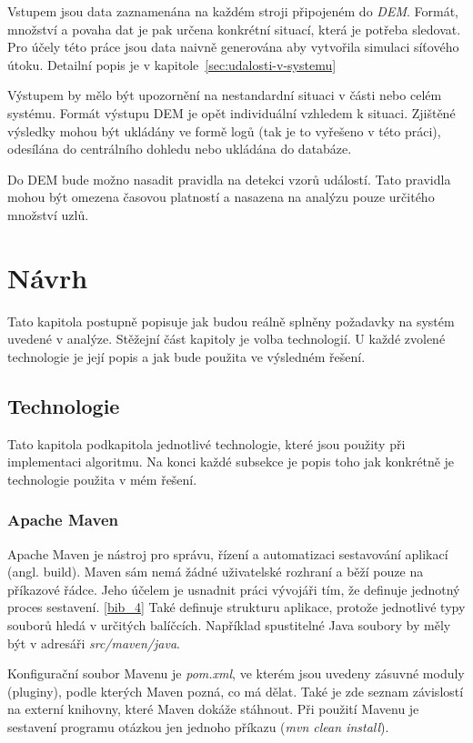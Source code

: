 \documentclass[
  digital, %
  table,   %
  nolof,     %
  nolot,     %
  twoside, %
  nocover,
  monochrome,
  12pt
]{fithesis3}
\begin{document}
Vstupem jsou data zaznamenána na každém stroji připojeném do \textit{DEM}. Formát, množství a povaha dat je pak určena konkrétní situací, která je potřeba sledovat. Pro účely této práce jsou data naivně generována aby vytvořila simulaci síťového útoku. Detailní popis je v kapitole~\ref{sec:udalosti-v-systemu}

Výstupem by mělo být upozornění na nestandardní situaci v části nebo celém systému. Formát výstupu DEM je opět individuální vzhledem k situaci. Zjištěné výsledky mohou být ukládány ve formě logů (tak je to vyřešeno v této práci), odesílána do centrálního dohledu nebo ukládána do databáze.

Do DEM bude možno nasadit pravidla na detekci vzorů událostí. Tato pravidla mohou být omezena časovou platností a nasazena na analýzu pouze určitého množství uzlů.
\chapter{Návrh}
Tato kapitola postupně popisuje jak budou reálně splněny požadavky na systém uvedené v analýze. Stěžejní část kapitoly je volba technologií. U každé zvolené technologie je její popis a jak bude použita ve výsledném řešení.

\section{Technologie}
Tato kapitola podkapitola jednotlivé technologie, které jsou použity při implementaci algoritmu. Na konci každé subsekce je popis toho jak konkrétně je technologie použita v mém řešení.

\subsection{Apache Maven}
Apache Maven je nástroj pro správu, řízení a automatizaci sestavování aplikací (angl. build). Maven sám nemá žádné uživatelské rozhraní a běží pouze na příkazové řádce. Jeho účelem je usnadnit práci vývojáři tím, že definuje jednotný proces sestavení. \ref{bib_4} Také definuje strukturu aplikace, protože jednotlivé typy souborů hledá v určitých balíčcích. Například spustitelné Java soubory by měly být v adresáři \textit{src/maven/java}.

Konfigurační soubor Mavenu je \textit{pom.xml}, ve kterém jsou uvedeny zásuvné moduly (pluginy), podle kterých Maven pozná, co má dělat. Také je zde seznam závislostí na externí knihovny, které Maven dokáže stáhnout. Při použití Mavenu je sestavení programu otázkou jen jednoho příkazu (\textit{mvn clean install}).
\end{document}
